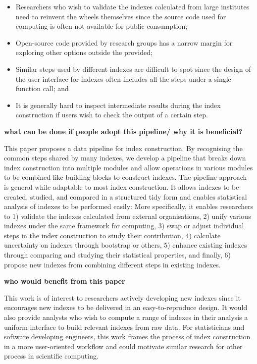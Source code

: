 \documentclass[
]{article}
\providecommand{\tightlist}{%
  \setlength{\itemsep}{0pt}\setlength{\parskip}{0pt}}\usepackage{longtable,booktabs,array}
\begin{document}
\begin{itemize}
\tightlist
\item
  Researchers who wish to validate the indexes calculated from large
  institutes need to reinvent the wheels themselves since the source
  code used for computing is often not available for public consumption;
\item
  Open-source code provided by research groups has a narrow margin for
  exploring other options outside the provided;
\item
  Similar steps used by different indexes are difficult to spot since
  the design of the user interface for indexes often includes all the
  steps under a single function call; and
\item
  It is generally hard to inspect intermediate results during the index
  construction if users wish to check the output of a certain step.
\end{itemize}

\textbf{what can be done if people adopt this pipeline/ why it is
beneficial?}

This paper proposes a data pipeline for index construction. By
recognising the common steps shared by many indexes, we develop a
pipeline that breaks down index construction into multiple modules and
allow operations in various modules to be combined like building blocks
to construct indexes. The pipeline approach is general while adaptable
to most index construction. It allows indexes to be created, studied,
and compared in a structured tidy form and enables statistical analysis
of indexes to be performed easily: More specifically, it enables
researchers to 1) validate the indexes calculated from external
organisations, 2) unify various indexes under the same framework for
computing, 3) swap or adjust individual steps in the index construction
to study their contribution, 4) calculate uncertainty on indexes through
bootstrap or others, 5) enhance existing indexes through comparing and
studying their statistical properties, and finally, 6) propose new
indexes from combining different steps in existing indexes.

\textbf{who would benefit from this paper}

This work is of interest to researchers actively developing new indexes
since it encourages new indexes to be delivered in an easy-to-reproduce
design. It would also provide analysts who wish to compute a range of
indexes in their analysis a uniform interface to build relevant indexes
from raw data. For statisticians and software developing engineers, this
work frames the process of index construction in a more user-oriented
workflow and could motivate similar research for other process in
scientific computing.
\end{document}
